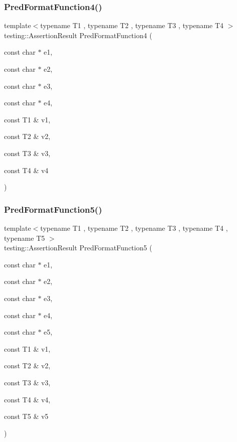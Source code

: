 \subsubsection{\texorpdfstring{PredFormatFunction4()}{PredFormatFunction4()}}
{\footnotesize\ttfamily template$<$typename T1 , typename T2 , typename T3 , typename T4 $>$ \\
testing\+::\+Assertion\+Result Pred\+Format\+Function4 (\begin{DoxyParamCaption}\item[{const char $\ast$}]{e1,  }\item[{const char $\ast$}]{e2,  }\item[{const char $\ast$}]{e3,  }\item[{const char $\ast$}]{e4,  }\item[{const T1 \&}]{v1,  }\item[{const T2 \&}]{v2,  }\item[{const T3 \&}]{v3,  }\item[{const T4 \&}]{v4 }\end{DoxyParamCaption})}

\mbox{\label{googletest-master_2googletest_2test_2gtest__pred__impl__unittest_8cc_a09cbd3b6651151c3b97a890d28bdb75f}} 
\subsubsection{\texorpdfstring{PredFormatFunction5()}{PredFormatFunction5()}}
{\footnotesize\ttfamily template$<$typename T1 , typename T2 , typename T3 , typename T4 , typename T5 $>$ \\
testing\+::\+Assertion\+Result Pred\+Format\+Function5 (\begin{DoxyParamCaption}\item[{const char $\ast$}]{e1,  }\item[{const char $\ast$}]{e2,  }\item[{const char $\ast$}]{e3,  }\item[{const char $\ast$}]{e4,  }\item[{const char $\ast$}]{e5,  }\item[{const T1 \&}]{v1,  }\item[{const T2 \&}]{v2,  }\item[{const T3 \&}]{v3,  }\item[{const T4 \&}]{v4,  }\item[{const T5 \&}]{v5 }\end{DoxyParamCaption})}

